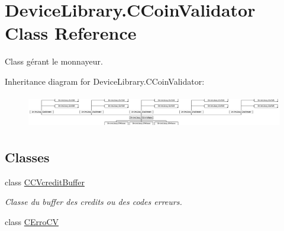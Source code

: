 \hypertarget{class_device_library_1_1_c_coin_validator}{}\section{Device\+Library.\+C\+Coin\+Validator Class Reference}
\label{class_device_library_1_1_c_coin_validator}


Class gérant le monnayeur.  


Inheritance diagram for Device\+Library.\+C\+Coin\+Validator\+:\begin{figure}[H]
\begin{center}
\leavevmode
\includegraphics[height=1.465969cm]{class_device_library_1_1_c_coin_validator}
\end{center}
\end{figure}
\subsection*{Classes}
\begin{DoxyCompactItemize}
\item 
class \mbox{\hyperlink{class_device_library_1_1_c_coin_validator_1_1_c_c_vcredit_buffer}{C\+C\+Vcredit\+Buffer}}
\begin{DoxyCompactList}\small\item\em Classe du buffer des credits ou des codes erreurs. \end{DoxyCompactList}\item 
class \mbox{\hyperlink{class_device_library_1_1_c_coin_validator_1_1_c_erro_c_v}{C\+Erro\+CV}}
\end{DoxyCompactItemize}
